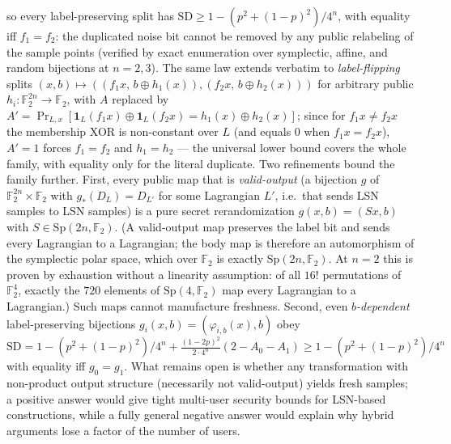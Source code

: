 \documentclass[11pt,a4paper]{article}
\theoremstyle{plain}
\theoremstyle{definition}
\newcommand{\F}{\mathbb{F}}
\begin{document}
\begin{enumerate}
so every label-preserving split has $\mathrm{SD} \ge 1 - (p^2 + (1-p)^2)/4^n$, with equality iff $f_1 = f_2$: the duplicated noise bit cannot be removed by any public relabeling of the sample points (verified by exact enumeration over symplectic, affine, and random bijections at $n = 2, 3$). The same law extends verbatim to \emph{label-flipping} splits $(x,b) \mapsto ((f_1 x,\, b \oplus h_1(x)), (f_2 x,\, b \oplus h_2(x)))$ for arbitrary public $h_i : \F_2^{2n} \to \F_2$, with $A$ replaced by $A' = \Pr_{L,x}[\mathbf 1_L(f_1 x) \oplus \mathbf 1_L(f_2 x) = h_1(x) \oplus h_2(x)]$; since for $f_1 x \neq f_2 x$ the membership XOR is non-constant over $L$ (and equals $0$ when $f_1 x = f_2 x$), $A' = 1$ forces $f_1 = f_2$ and $h_1 = h_2$ --- the universal lower bound covers the whole family, with equality only for the literal duplicate. Two refinements bound the family further. First, every public map that is \emph{valid-output} (a bijection $g$ of $\F_2^{2n} \times \F_2$ with $g_*(D_L) = D_{L'}$ for some Lagrangian $L'$, i.e.\ that sends LSN samples to LSN samples) is a pure secret rerandomization $g(x,b) = (S x, b)$ with $S \in \mathrm{Sp}(2n,\F_2)$. (A valid-output map preserves the label bit and sends every Lagrangian to a Lagrangian; the body map is therefore an automorphism of the symplectic polar space, which over $\F_2$ is exactly $\mathrm{Sp}(2n,\F_2)$. At $n=2$ this is proven by exhaustion without a linearity assumption: of all $16!$ permutations of $\F_2^4$, exactly the $720$ elements of $\mathrm{Sp}(4,\F_2)$ map every Lagrangian to a Lagrangian.) Such maps cannot manufacture freshness. Second, even \emph{$b$-dependent} label-preserving bijections $g_i(x,b) = (\varphi_{i,b}(x), b)$ obey $\mathrm{SD} = 1 - (p^2+(1-p)^2)/4^n + \tfrac{(1-2p)^2}{2\cdot 4^n}(2 - A_0 - A_1) \ge 1 - (p^2+(1-p)^2)/4^n$ with equality iff $g_0 = g_1$. What remains open is whether any transformation with non-product output structure (necessarily not valid-output) yields fresh samples; a positive answer would give tight multi-user security bounds for LSN-based constructions, while a fully general negative answer would explain why hybrid arguments lose a factor of the number of users.


\end{enumerate}
\end{document}
